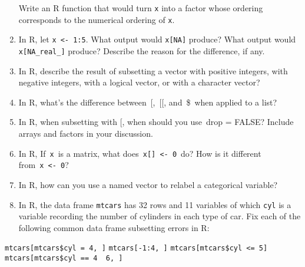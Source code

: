 \documentclass[
]{article}
\begin{document}
\begin{enumerate}
  Write an R function that would turn \texttt{x} into a factor whose
  ordering corresponds to the numerical ordering of \texttt{x}.
  \vspace{0px}
\item
  In R, let \texttt{x\ \textless{}-\ 1:5}. What output would
  \texttt{x{[}NA{]}} produce? What output would
  \texttt{x{[}NA\_real\_{]}} produce? Describe the reason for the
  difference, if any. \vspace{0px}
\item
  In R, describe the result of subsetting a vector with positive
  integers, with negative integers, with a logical vector, or with a
  character vector? \vspace{0px}
\item
  In R, what's the difference between~{[},~{[}{[}, and~\$~when applied
  to a list? \vspace{0px}
\item
  In R, when subsetting with {[}, when should you use~drop = FALSE?
  Include arrays and factors in your discussion. \vspace{0px}
\item
  In R, If~\texttt{x}~is a matrix, what
  does~\texttt{x{[}{]}\ \textless{}-\ 0}~do? How is it different
  from~\texttt{x\ \textless{}-\ 0}? \vspace{0px}
\item
  In R, how can you use a named vector to relabel a categorical
  variable? \vspace{0px}
\item
  In R, the data frame \texttt{mtcars} has 32 rows and 11 variables of
  which \texttt{cyl} is a variable recording the number of cylinders in
  each type of car. Fix each of the following common data frame
  subsetting errors in R: \newline\newline
\end{enumerate}

\texttt{mtcars{[}mtcars\$cyl\ =\ 4,\ {]}}\newline\newline\newline\newline
\texttt{mtcars{[}-1:4,\ {]}}\newline\newline\newline\newline
\texttt{mtcars{[}mtcars\$cyl\ \textless{}=\ 5{]}}\newline\newline\newline\newline
\texttt{mtcars{[}mtcars\$cyl\ ==\ 4\ \textbar{}\ 6,\ {]}}\newline\newline\newline\newline
\end{document}
